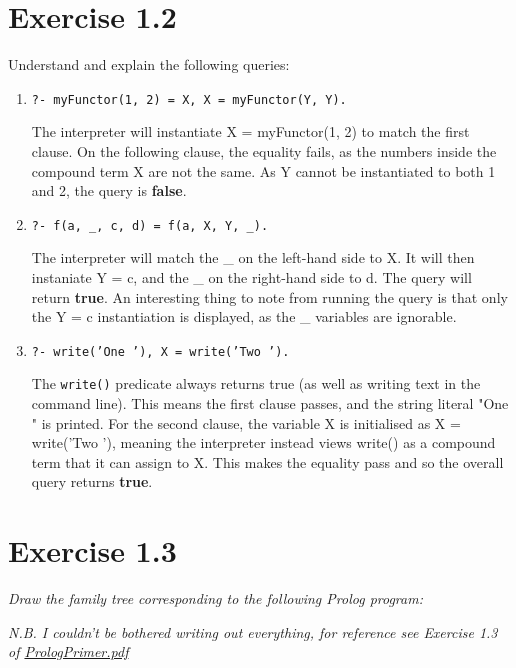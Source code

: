 \documentclass{report}
\newcommand{\code}[1]{\texttt{#1}}
\begin{document}
\section*{\textbf{Exercise 1.2}}
Understand and explain the following queries:
\begin{enumerate}[label=(\alph*)]

    \item \code{?- myFunctor(1, 2) = X, X = myFunctor(Y, Y).}
    
    The interpreter will instantiate X = myFunctor(1, 2) to match the first clause. On the following clause, the equality fails, as the numbers inside the compound term X are not the same. As Y cannot be instantiated to both 1 and 2, the query is \textbf{false}.

    \item \code{?- f(a, \_, c, d) = f(a, X, Y, \_).}
    
    The interpreter will match the \_ on the left-hand side to X. It will then instaniate Y = c, and the \_ on the right-hand side to d. The query will return \textbf{true}. An interesting thing to note from running the query is that only the Y = c instantiation is displayed, as the \_ variables are ignorable.

    \item \code{?- write('One '), X = write('Two ').}
    
    The \code{write()} predicate always returns true (as well as writing text in the command line). This means the first clause passes, and the string literal "One " is printed. For the second clause, the variable X is initialised as X = write('Two '), meaning the interpreter instead views write() as a compound term that it can assign to X. This makes the equality pass and so the overall query returns \textbf{true}.

\end{enumerate}

\section*{\textbf{Exercise 1.3}}
\emph{Draw the family tree corresponding to the following Prolog program:}

\noindent\emph{N.B. I couldn't be bothered writing out everything, for reference see Exercise 1.3 of \href{run:./PrologPrimer.pdf}{PrologPrimer.pdf}}
\end{document}
